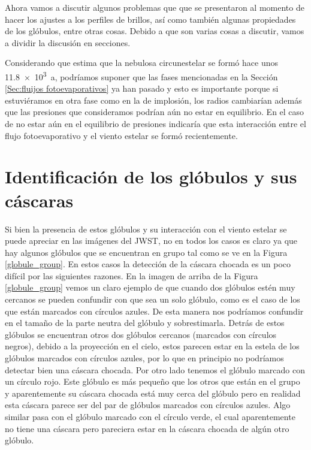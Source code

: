 \documentclass{book}
\begin{document}
Ahora vamos a discutir algunos problemas que que se presentaron al momento de hacer los ajustes a los perfiles de brillos, así como también algunas propiedades de los glóbulos, entre otras cosas. Debido a que son varias cosas a discutir, vamos a dividir la discusión en secciones.

Considerando que \cite{Zavala:2022} estima que la nebulosa circunestelar se formó hace unos \SI{11.8e3}{a}, podríamos suponer que las fases mencionadas en la Sección \ref{Sec:fluijos fotoevaporativos} ya han pasado y esto es importante porque si estuviéramos en otra fase como en la de implosión, los radios cambiarían además que las presiones que consideramos podrían aún no estar en equilibrio. En el caso de no estar aún en el equilibrio de presiones indicaría que esta interacción entre el flujo fotoevaporativo y el viento estelar se formó recientemente.\\

\section{Identificación de los glóbulos y sus cáscaras}\label{dis:casaras}


Si bien la presencia de estos glóbulos y su interacción con el viento estelar se puede apreciar en las imágenes del JWST, no en todos los casos es claro ya que hay algunos glóbulos que se encuentran en grupo tal como se ve en la Figura \ref{globule_group}. En estos casos la detección de la cáscara chocada es un poco difícil por las siguientes razones. En la imagen de arriba de la Figura \ref{globule_group} vemos un claro ejemplo de que cuando dos glóbulos estén muy cercanos se pueden confundir con que sea un solo glóbulo, como es el caso de los que están marcados con círculos azules. De esta manera nos podríamos confundir en el tamaño de la parte neutra del glóbulo y sobrestimarla. Detrás de estos glóbulos se encuentran otros dos glóbulos cercanos (marcados con círculos negros), debido a la proyección en el cielo, estos parecen estar en la estela de los glóbulos marcados con círculos azules, por lo que en principio no podríamos detectar bien una cáscara chocada. Por otro lado tenemos el glóbulo marcado con un círculo rojo. Este glóbulo es más pequeño que los otros que están en el grupo y aparentemente su cáscara chocada está muy cerca del glóbulo pero en realidad esta cáscara parece ser del par de glóbulos marcados con círculos azules. Algo similar pasa con el glóbulo marcado con el círculo verde, el cual aparentemente no tiene una cáscara pero pareciera estar en la cáscara chocada de algún otro glóbulo.
\end{document}
